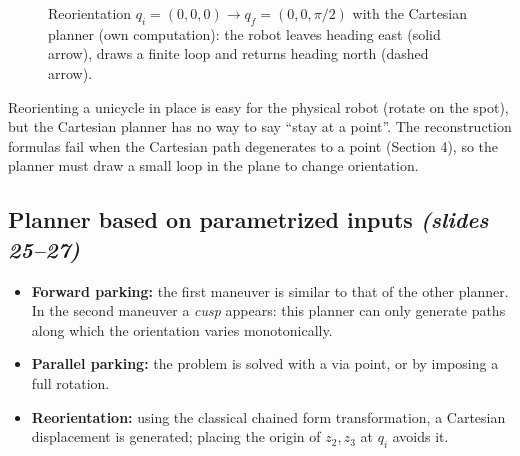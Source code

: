 \documentclass[11pt,a4paper]{article}
\def\boldsymbol#1{#1}%
\newcommand{\qi}{\boldsymbol{q}_i}
\newcommand{\qf}{\boldsymbol{q}_f}
\theoremstyle{definition}
\theoremstyle{plain}
\theoremstyle{remark}
\begin{document}
\begin{figure}[H]
\centering
{}
\caption{Reorientation $\qi=(0,0,0)\to\qf=(0,0,\pi/2)$ with the Cartesian planner (own computation): the robot leaves heading east
(solid arrow), draws a finite loop and returns heading north (dashed arrow).}
\end{figure}

\begin{intuition}
Reorienting a unicycle in place is easy for the physical robot (rotate on the spot), but the Cartesian planner has no way to say
``stay at a point''. The reconstruction formulas fail when the Cartesian path degenerates to a point (Section 4), so the planner must
draw a small loop in the plane to change orientation.
\end{intuition}

\subsection{Planner based on parametrized inputs \emph{(slides 25--27)}}

\begin{itemize}
\item \textbf{Forward parking:} the first maneuver is similar to that of the other planner. In the second maneuver a \emph{cusp} appears: this planner can only generate paths along which the orientation varies monotonically.
\item \textbf{Parallel parking:} the problem is solved with a via point, or by imposing a full rotation.
\item \textbf{Reorientation:} using the classical chained form transformation, a Cartesian displacement is generated; placing the origin of $z_2,z_3$ at $\qi$ avoids it.
\end{itemize}
\end{document}
